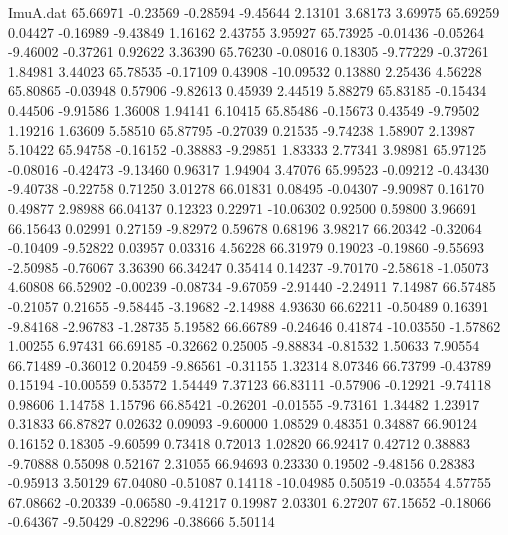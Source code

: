 \begin{filecontents}{ImuA.dat}
  65.66971   -0.23569   -0.28594   -9.45644    2.13101    3.68173    3.69975
  65.69259    0.04427   -0.16989   -9.43849    1.16162    2.43755    3.95927
  65.73925   -0.01436   -0.05264   -9.46002   -0.37261    0.92622    3.36390
  65.76230   -0.08016    0.18305   -9.77229   -0.37261    1.84981    3.44023
  65.78535   -0.17109    0.43908  -10.09532    0.13880    2.25436    4.56228
  65.80865   -0.03948    0.57906   -9.82613    0.45939    2.44519    5.88279
  65.83185   -0.15434    0.44506   -9.91586    1.36008    1.94141    6.10415
  65.85486   -0.15673    0.43549   -9.79502    1.19216    1.63609    5.58510
  65.87795   -0.27039    0.21535   -9.74238    1.58907    2.13987    5.10422
  65.94758   -0.16152   -0.38883   -9.29851    1.83333    2.77341    3.98981
  65.97125   -0.08016   -0.42473   -9.13460    0.96317    1.94904    3.47076
  65.99523   -0.09212   -0.43430   -9.40738   -0.22758    0.71250    3.01278
  66.01831    0.08495   -0.04307   -9.90987    0.16170    0.49877    2.98988
  66.04137    0.12323    0.22971  -10.06302    0.92500    0.59800    3.96691
  66.15643    0.02991    0.27159   -9.82972    0.59678    0.68196    3.98217
  66.20342   -0.32064   -0.10409   -9.52822    0.03957    0.03316    4.56228
  66.31979    0.19023   -0.19860   -9.55693   -2.50985   -0.76067    3.36390
  66.34247    0.35414    0.14237   -9.70170   -2.58618   -1.05073    4.60808
  66.52902   -0.00239   -0.08734   -9.67059   -2.91440   -2.24911    7.14987
  66.57485   -0.21057    0.21655   -9.58445   -3.19682   -2.14988    4.93630
  66.62211   -0.50489    0.16391   -9.84168   -2.96783   -1.28735    5.19582
  66.66789   -0.24646    0.41874  -10.03550   -1.57862    1.00255    6.97431
  66.69185   -0.32662    0.25005   -9.88834   -0.81532    1.50633    7.90554
  66.71489   -0.36012    0.20459   -9.86561   -0.31155    1.32314    8.07346
  66.73799   -0.43789    0.15194  -10.00559    0.53572    1.54449    7.37123
  66.83111   -0.57906   -0.12921   -9.74118    0.98606    1.14758    1.15796
  66.85421   -0.26201   -0.01555   -9.73161    1.34482    1.23917    0.31833
  66.87827    0.02632    0.09093   -9.60000    1.08529    0.48351    0.34887
  66.90124    0.16152    0.18305   -9.60599    0.73418    0.72013    1.02820
  66.92417    0.42712    0.38883   -9.70888    0.55098    0.52167    2.31055
  66.94693    0.23330    0.19502   -9.48156    0.28383   -0.95913    3.50129
  67.04080   -0.51087    0.14118  -10.04985    0.50519   -0.03554    4.57755
  67.08662   -0.20339   -0.06580   -9.41217    0.19987    2.03301    6.27207
  67.15652   -0.18066   -0.64367   -9.50429   -0.82296   -0.38666    5.50114

\end{filecontents}
